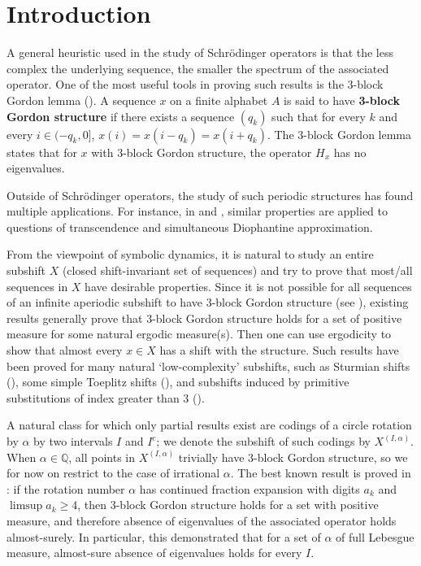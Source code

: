 \documentclass[11pt,reqno]{amsart}
\theoremstyle{definition}
\theoremstyle{plain}
\begin{document}
\maketitle

\section{Introduction}\label{sec:intro}

A general heuristic used in the study of Schr\"{o}dinger operators is that the less complex the underlying sequence, the smaller the spectrum of the associated operator. One of the most useful tools in proving such results is the $3$-block Gordon lemma (\cite{3block}). A sequence $x$ on a finite alphabet $A$ is said to have {\bf 3-block Gordon structure} if there exists a sequence $(q_k)$ such that for every $k$ and every $i \in (-q_k, 0]$, $x(i) = x(i - q_k) = x(i + q_k)$. The $3$-block Gordon lemma states that for $x$ with $3$-block Gordon structure, the operator $H_x$ has no eigenvalues. 

Outside of Schr\"{o}dinger operators, the study of such periodic structures has found multiple applications. For instance, in \cite{trans} and \cite{roy}, similar properties are applied to questions of transcendence and simultaneous Diophantine approximation.

From the viewpoint of symbolic dynamics, it is natural to study an entire subshift $X$ (closed shift-invariant set of sequences) and try to prove that most/all sequences in $X$ have desirable properties. Since it is not possible for all sequences of an infinite aperiodic subshift to have $3$-block Gordon structure (see \cite{no3block}), existing results generally prove that $3$-block Gordon structure holds for a set of positive measure for some natural ergodic measure(s). Then one can use ergodicity to show that almost every $x \in X$ has a shift with the structure. Such results have been proved for many natural `low-complexity' subshifts, such as Sturmian shifts (\cite{sturm}), some simple Toeplitz shifts (\cite{sellthesis}), and subshifts induced by primitive substitutions of index greater than $3$ (\cite{index3}).

A natural class for which only partial results exist are codings of a circle rotation by $\alpha$ by two intervals $I$ and $I^c$; we denote the subshift of such codings by $X^{(I,\alpha)}$. When $\alpha \in \mathbb{Q}$, all points in $X^{(I,\alpha)}$ trivially have $3$-block Gordon structure, so we for now on restrict to the case of irrational $\alpha$.
The best known result is proved in \cite{kaminaga}: if the rotation number $\alpha$ has continued fraction expansion with digits $a_k$ and $\limsup a_k \geq 4$, then $3$-block Gordon structure holds for a set with positive measure, and therefore absence of eigenvalues of the associated operator holds almost-surely. 
In particular, this demonstrated that for a set of $\alpha$ of full Lebesgue measure, almost-sure absence of eigenvalues holds for every $I$.
\end{document}
